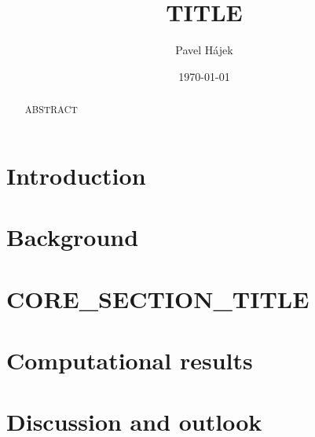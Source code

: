 \documentclass[10pt,a4paper]{amsart}
\theoremstyle{plain}
\theoremstyle{definition}
\theoremstyle{remark}
\begin{document}

\title{{{TITLE}}}
\author{Pavel H\'ajek}
\address{}
\date{\today}

\begin{abstract}
{{ABSTRACT}}
\end{abstract}

\maketitle
\tableofcontents

\section{Introduction}\label{sec:intro}



\section{Background}\label{sec:background}



\section{{{CORE_SECTION_TITLE}}}\label{sec:core}



\section{Computational results}\label{sec:computation}



\section{Discussion and outlook}\label{sec:outlook}






\end{document}
